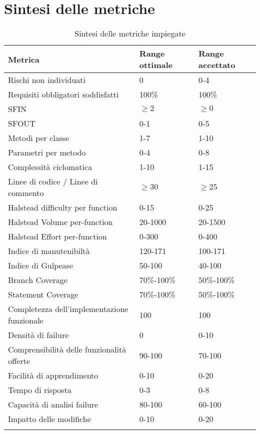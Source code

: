 \section{Sintesi delle metriche}
\begin{longtable}[H]{|C{5cm}|C{3.5cm}|C{3.5cm}|}
		\hline
		\textbf{Metrica} & \textbf{Range ottimale} & \textbf{Range accettato}  \\ \hline
		Rischi non individuati & 0 & 0-4 \\ \hline
		Requisiti obbligatori soddisfatti & 100\% & 100\% \\ \hline
		SFIN & $\geq 2$ & $\geq 0$ \\ \hline
		SFOUT & 0-1 & 0-5 \\ \hline
		Metodi per classe & 1-7 & 1-10 \\ \hline
		Parametri per metodo & 0-4 & 0-8 \\ \hline
		Complessità ciclomatica & 1-10 & 1-15 \\ \hline
		Linee di codice / Linee di commento & $\geq30$ & $\geq25$ \\ \hline
		Halstead difficulty per function & 0-15 & 0-25 \\ \hline
		Halstead Volume per-function & 20-1000 &  20-1500 \\ \hline
		Halstead Effort per-function & 0-300 & 0-400 \\ \hline
		Indice di manutenibiltà & 120-171 & 100-171 \\ \hline
		Indice di Gulpease & 50-100 & 40-100 \\ \hline
		Branch Coverage & 70\%-100\% & 50\%-100\% \\ \hline
		Statement Coverage & 70\%-100\% & 50\%-100\% \\ \hline
		Completezza dell'implementazione funzionale & 100 & 100 \\ \hline
		Densità di failure & 0 & 0-10 \\ \hline
		Comprensibilità delle funzionalità offerte & 90-100 & 70-100 \\ \hline
		Facilità di apprendimento & 0-10 & 0-20 \\ \hline
		Tempo di risposta & 0-3 & 0-8 \\ \hline
		Capacità di analisi failure & 80-100 & 60-100 \\ \hline
		Impatto delle modifiche & 0-10 & 0-20 \\ \hline
		\caption{Sintesi delle metriche impiegate}
\end{longtable}